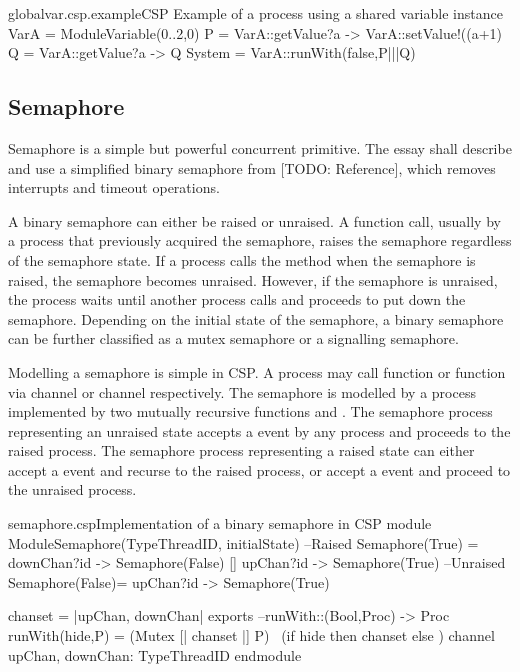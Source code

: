 \documentclass{article}
\begin{document}
\begin{cspinline}{globalvar.csp.example}{CSP Example of a process using a shared variable}
instance VarA = ModuleVariable({0..2},0)
P = VarA::getValue?a -> VarA::setValue!((a+1)%
Q = VarA::getValue?a -> Q
System = VarA::runWith(false,P|||Q)
\end{cspinline}


\subsection{Semaphore}
Semaphore is a simple but powerful concurrent primitive. The essay shall describe and use a simplified binary semaphore from [TODO: Reference], which removes interrupts and timeout operations. 

A binary semaphore can either be raised or unraised. A  function call, usually by a process that previously acquired the semaphore, raises the semaphore regardless of the semaphore state. If a process calls the  method when the semaphore is raised, the semaphore becomes unraised. However, if the semaphore is unraised, the process waits until another process calls  and proceeds to put down the semaphore. Depending on the initial state of the semaphore, a binary semaphore can be further classified as a mutex semaphore or a signalling semaphore.

Modelling a semaphore is simple in CSP. A process may call  function or  function via channel  or channel  respectively. The semaphore is modelled by a process implemented by two mutually recursive functions  and . The semaphore process representing an unraised state accepts a  event by any process and proceeds to the raised process. The semaphore process representing a raised state can either accept a  event and recurse to the raised process, or accept a  event and proceed to the unraised process.

\begin{cspinline}{semaphore.csp}{Implementation of a binary semaphore in CSP}
module ModuleSemaphore(TypeThreadID, initialState)
  --Raised
  Semaphore(True) = downChan?id -> Semaphore(False)
                   [] upChan?id -> Semaphore(True)
  --Unraised
  Semaphore(False)= upChan?id   -> Semaphore(True)
  
  chanset = {|upChan, downChan|}
exports
  --runWith::(Bool,Proc) -> Proc
  runWith(hide,P) = (Mutex [| chanset |] P) \ 
                     (if hide then chanset else {})
  channel upChan, downChan: TypeThreadID
endmodule
\end{cspinline}
\end{document}
